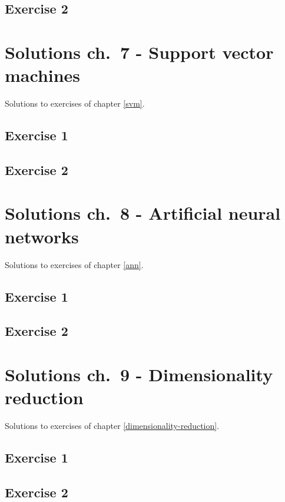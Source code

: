 \documentclass[]{book}
\theoremstyle{definition}
\theoremstyle{definition}
\theoremstyle{definition}
\theoremstyle{remark}
\begin{document}
\section{Exercise 2}\label{exercise-2-3}

\chapter{Solutions ch.~7 - Support vector machines}\label{solutions-svm}

Solutions to exercises of chapter \ref{svm}.

\section{Exercise 1}\label{exercise-1-4}

\section{Exercise 2}\label{exercise-2-4}

\chapter{Solutions ch.~8 - Artificial neural
networks}\label{solutions-ann}

Solutions to exercises of chapter \ref{ann}.

\section{Exercise 1}\label{exercise-1-5}

\section{Exercise 2}\label{exercise-2-5}

\chapter{Solutions ch.~9 - Dimensionality
reduction}\label{solutions-dimensionality-reduction}

Solutions to exercises of chapter \ref{dimensionality-reduction}.

\section{Exercise 1}\label{exercise-1-6}

\section{Exercise 2}\label{exercise-2-6}
\end{document}
